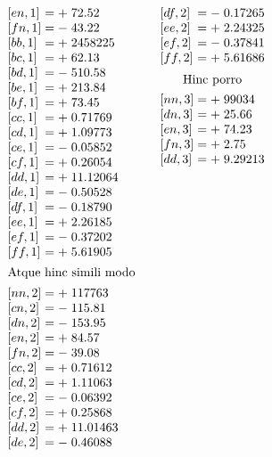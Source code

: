 {\[\begin{array}{@{}l@{\qquad}l@{\qquad}l@{}}
\begin{array}[t]{@{}l@{\;}c@{\;}c@{\;}l@{}}
{[en,1]}&=&+&72.52\\
{[fn,1]}&=&-&43.22\\
{[bb,1]}&=&+&2458225\\
{[bc,1]}&=&+&62.13\\
{[bd,1]}&=&-&510.58\\
{[be,1]}&=&+&213.84\\
{[bf,1]}&=&+&73.45\\
{[cc,1]}&=&+&0.71769\\
{[cd,1]}&=&+&1.09773\\
{[ce,1]}&=&-&0.05852\\
{[cf,1]}&=&+&0.26054\\
{[dd,1]}&=&+&11.12064\\
{[de,1]}&=&-&0.50528\\
{[df,1]}&=&-&0.18790\\
{[ee,1]}&=&+&2.26185\\
{[ef,1]}&=&-&0.37202\\
{[ff,1]}&=&+&5.61905\\[4.5pt]
\multicolumn{4}{@{}c@{}}{\text{Atque hinc simili modo}}\\[4.5pt]
{[nn,2]}&=&+&117763\\
{[cn,2]}&=&-&115.81\\
{[dn,2]}&=&-&153.95\\
{[en,2]}&=&+&84.57\\
{[fn,2]}&=&-&39.08\\
{[cc,2]}&=&+&0.71612\\
{[cd,2]}&=&+&1.11063\\
{[ce,2]}&=&-&0.06392\\
{[cf,2]}&=&+&0.25868\\
{[dd,2]}&=&+&11.01463\\
{[de,2]}&=&-&0.46088
\end{array}&
\begin{array}[t]{@{}l@{\;}c@{\;}c@{\;}l@{}}
{[df,2]}&=&-&0.17265\\
{[ee,2]}&=&+&2.24325\\
{[ef,2]}&=&-&0.37841\\
{[ff,2]}&=&+&5.61686\\[5.5pt]
\multicolumn{4}{@{}c@{}}{\text{Hinc porro}}\\[4pt]
{[nn,3]}&=&+&99034\\
{[dn,3]}&=&+&25.66\\
{[en,3]}&=&+&74.23\\
{[fn,3]}&=&+&2.75\\
{[dd,3]}&=&+&9.29213\\

\end{array}
\end{array}\]}
